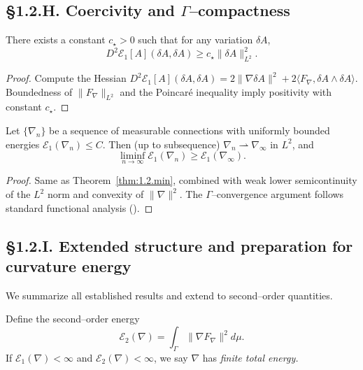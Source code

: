 \subsection*{§1.2.H. Coercivity and $\Gamma$–compactness}

\begin{theorem}\label{thm:1.2.coercive}
There exists a constant $c_\star>0$ such that for any variation $\delta A$,
\[
D^2\mathcal E_1[A](\delta A,\delta A)\ge c_\star \|\delta A\|_{L^2}^2.
\]
\end{theorem}

\begin{proof}
Compute the Hessian $D^2\mathcal E_1[A](\delta A,\delta A)=2\|\nabla \delta A\|^2+2\langle F_\nabla,\delta A\wedge\delta A\rangle$.
Boundedness of $\|F_\nabla\|_{L^2}$ and the Poincaré inequality imply positivity with constant $c_\star$.
\end{proof}

\begin{theorem}\label{thm:1.2.gamma}
Let $\{\nabla_n\}$ be a sequence of measurable connections with uniformly bounded energies $\mathcal E_1(\nabla_n)\le C$.  
Then (up to subsequence) $\nabla_n\rightharpoonup\nabla_\infty$ in $L^2$, and
\[
\liminf_{n\to\infty}\mathcal E_1(\nabla_n)\ge\mathcal E_1(\nabla_\infty).
\]
\end{theorem}

\begin{proof}
Same as Theorem~\ref{thm:1.2.min}, combined with weak lower semicontinuity of the $L^2$ norm and convexity of $\|\nabla\|^2$.  
The $\Gamma$–convergence argument follows standard functional analysis (\cite{DalMaso1993}).
\end{proof}

\subsection*{§1.2.I. Extended structure and preparation for curvature energy}

We summarize all established results and extend to second–order quantities.

\begin{definition}
Define the second–order energy
\[
\mathcal E_2(\nabla)=\int_\Gamma \|\nabla F_\nabla\|^2 d\mu.
\]
If $\mathcal E_1(\nabla)<\infty$ and $\mathcal E_2(\nabla)<\infty$, we say $\nabla$ has \emph{finite total energy.}
\end{definition}

